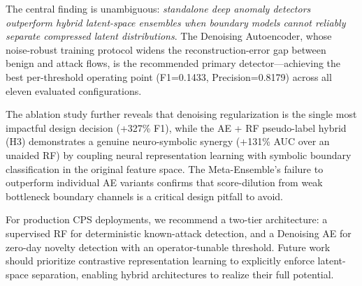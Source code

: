 \documentclass[10pt,journal,compsoc]{IEEEtran}
\begin{document}
The central finding is unambiguous: \emph{standalone deep anomaly
detectors outperform hybrid latent-space ensembles when boundary
models cannot reliably separate compressed latent distributions}.  The
Denoising Autoencoder, whose noise-robust training protocol widens
the reconstruction-error gap between benign and attack flows, is the
recommended primary detector---achieving the best per-threshold
operating point (F1=0.1433, Precision=0.8179) across all eleven
evaluated configurations.

The ablation study further reveals that denoising regularization is
the single most impactful design decision (+327\% F1), while the
AE + RF pseudo-label hybrid (H3) demonstrates a genuine neuro-symbolic
synergy (+131\% AUC over an unaided RF) by coupling neural
representation learning with symbolic boundary classification in the
original feature space.  The Meta-Ensemble's failure to outperform
individual AE variants confirms that score-dilution from weak
bottleneck boundary channels is a critical design pitfall to avoid.

For production CPS deployments, we recommend a two-tier architecture:
a supervised RF for deterministic known-attack detection, and a
Denoising AE for zero-day novelty detection with an operator-tunable
threshold.  Future work should prioritize contrastive representation
learning to explicitly enforce latent-space separation, enabling
hybrid architectures to realize their full potential.

\balance


\end{document}
